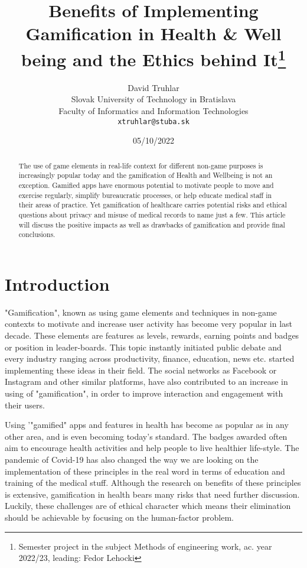 \documentclass[10pt,oneside,english,coursepaper]{article}
\title{Benefits of Implementing Gamification in Health \& Well being and the Ethics behind It\thanks{Semester project in the subject Methods of engineering work, ac. year 2022/23, leading: Fedor Lehocki}} %
\author{David Truhlar\\[2pt]
	{\small Slovak University of Technology in Bratislava}\\
	{\small Faculty of Informatics and Information Technologies}\\
	{\small \texttt{xtruhlar@stuba.sk}}
	}
\date{\small 05/10/2022} %
\begin{document}
\maketitle

\begin{abstract}
The use of game elements in real-life context for different non-game purposes is increasingly popular today and the gamification of Health and Wellbeing is not an exception. Gamified apps have enormous potential to motivate people to move and exercise regularly, simplify bureaucratic processes, or help educate medical staff in their areas of practice. Yet gamification of healthcare carries potential risks and ethical questions about privacy and misuse of medical records to name just a few. This article will discuss the positive impacts as well as drawbacks of gamification and provide final conclusions.
\end{abstract}

%
%
%

\section{Introduction}
"Gamification", known as using game elements and techniques  in non-game contexts to motivate and increase user activity \cite{Gamefulness} has become very popular in last decade. These elements are features as levels, rewards, earning points and badges or position in leader-boards. This topic instantly initiated public debate and every industry ranging across productivity, finance, education, news etc. \cite{Gamefulness} started implementing these ideas in their field. The social networks as Facebook or Instagram and other similar platforms, have also contributed to an increase in using of "gamification", in order to improve interaction and engagement with their users. 

Using '"gamified" apps and features in health  has become as popular as  in any other area, and is even becoming today's standard. The badges awarded often aim to encourage health activities and help people to live healthier life-style. The pandemic of Covid-19 has also changed the way we are looking on the implementation of these principles in the real word in terms of education and training of the medical stuff.  Although the research on benefits of these principles is extensive, gamification in health bears many risks that need further discussion. Luckily, these challenges are of ethical character which means their elimination should be achievable by focusing on the human-factor problem.
\end{document}
